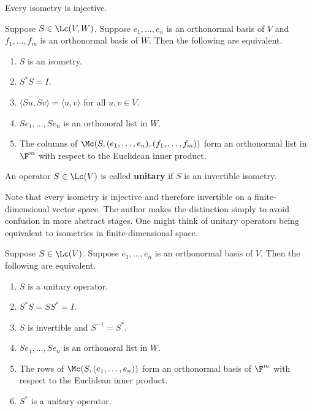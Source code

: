 \documentclass{extarticle}
\begin{document}
\begin{remark}
    Every isometry is injective.
\end{remark}

\begin{thm}
    Suppose \(S \in \Lc(V, W)\). Suppose \(e_1, \ldots, e_n\) is an orthonormal basis of \(V\)
    and \(f_1, \ldots, f_m\) is an orthonormal basis of \(W\). Then the following are equivalent.
    \begin{enumerate}[label=(\alph*)]
        \item \(S\) is an isometry.
        \item \(S^* S = I\).
        \item \(\langle Su,Sv \rangle = \langle u,v \rangle\) for all \(u, v \in V\).
        \item \(Se_1, \ldots, Se_n\) is an orthonoral list in \(W\).
        \item The columns of \(\Mc(S, (e_1, \ldots, e_n), (f_1, \ldots, f_m))\) form an orthonormal
        list in \(\F^m\) with respect to the Euclidean inner product.
    \end{enumerate}
\end{thm}

\begin{definition}
    An operator \(S \in \Lc(V)\) is called \textbf{unitary} if \(S\) is an invertible isometry.
\end{definition}


\begin{remark}
    Note that every isometry is injective and therefore invertible on a finite-dimensional vector
    space. The author makes the distinction simply to avoid confusion in more abstract stages. One
    might think of unitary operators being equivalent to isometries in finite-dimensional space.
\end{remark}

\begin{thm}
    Suppose \(S \in \Lc(V)\). Suppose \(e_1, \ldots, e_n\) is an orthonormal basis of \(V\).
    Then the following are equivalent.
    \begin{enumerate}[label=(\alph*)]
        \item \(S\) is a unitary operator.
        \item \(S^* S = SS^* =  I\).
        \item \(S\) is invertible and \(S^{-1} =S^*\).
        \item \(Se_1, \ldots, Se_n\) is an orthonoral list in \(W\).
        \item The rows of \(\Mc(S, (e_1, \ldots, e_n))\) form an orthonormal
        basis of \(\F^m\) with respect to the Euclidean inner product.
        \item \(S^*\) is a unitary operator.
    \end{enumerate}
\end{thm}
\end{document}
